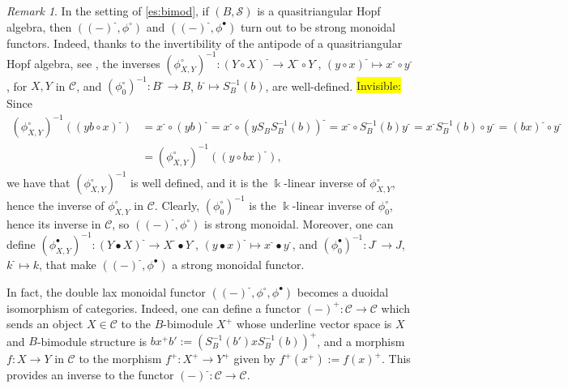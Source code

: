 \documentclass[nosumlimits,twoside]{amsart}
\theoremstyle{definition}
\theoremstyle{remark}
\newtheorem{remark}[remark]{\sc Remark}
\def\revsn{\text{-}}
\def\revsnp{\scriptscriptstyle{+}}
\newenvironment{invisible}{{\noindent\sc \colorbox{yellow}{Invisible:}\;}\color{gray}}{\medskip}
\newcommand{\as}[1]{{\color{blue}{#1}}}
\newcommand{\Cc}{\mathcal{C}}
\newcommand{\Ss}{\mathcal{S}}
\begin{document}
\begin{remark}\label{rmk:duoidaleqbim}%
    In the setting of \cref{es:bimod}, if $(B,\Ss)$ is a quasitriangular Hopf algebra, then $\left( \left( -\right) ^{\revsn },\phi^\circ \right)$ and $\left( \left( -\right) ^{\revsn },\phi^\bullet \right)$ turn out to be strong monoidal functors. Indeed, thanks to the invertibility of the antipode of a quasitriangular Hopf algebra, see \cite[Proposition 1]{Radford}, the inverses $(\phi^{\circ}_{X,Y})^{-1}:(Y\circ X)^{\revsn }\to X^{\revsn }\circ Y^{\revsn }$, $(y\circ x)^{\revsn }\mapsto x^{\revsn }\circ y^{\revsn }$, for $X,Y$ in $\Cc$, and $(\phi^{\circ}_{0})^{-1}:B^{\revsn}\to B$, $b^{\revsn}\mapsto S^{-1}_{B}(b)$, are well-defined. 
    \begin{invisible}
   Since
\[
\begin{split}
(\phi^{\circ}_{X,Y})^{-1}((yb\circ x)^{\revsn})&=x^{\revsn}\circ(yb)^{\revsn}=x^{\revsn}\circ(yS_{B}S^{-1}_{B}(b))^{\revsn}=x^{\revsn}\circ S^{-1}_{B}(b)y^{\revsn}=x^{\revsn}S^{-1}_{B}(b)\circ y^{\revsn}=(bx)^{\revsn}\circ y^{\revsn}\\&=(\phi^{\circ}_{X,Y})^{-1}((y\circ bx)^{\revsn}),
\end{split}
\]
we have that $(\phi^{\circ}_{X,Y})^{-1}$ is well defined, and it is the $\Bbbk$-linear inverse of $\phi^{\circ}_{X,Y}$, hence the inverse of $\phi^{\circ}_{X,Y}$ in $\Cc$. Clearly, $(\phi^{\circ}_{0})^{-1}$ is the $\Bbbk$-linear inverse of $\phi^{\circ}_{0}$, hence its inverse in $\Cc$, so $((-)^{\revsn},\phi^{\circ})$ is strong monoidal.\textbf{}    
    \end{invisible} 
    Moreover, one can define $(\phi^{\bullet}_{X,Y})^{-1}:(Y\bullet X)^{\revsn }\to X^{\revsn }\bullet Y^{\revsn }$, $(y\bullet x)^{\revsn }\mapsto x^{\revsn }\bullet y^{\revsn }$, and $(\phi^{\bullet}_{0})^{-1}:J^{\revsn}\to J$, $k^{\revsn}\mapsto k$, that make $((-)^{\revsn},\phi^{\bullet})$ a strong monoidal functor. 
    
    In fact, the double lax monoidal functor $\left( \left( -\right) ^{\revsn },\phi^\circ,\phi^{\bullet} \right)$ becomes a duoidal isomorphism of categories. Indeed, one can define a functor $(-)^{\revsnp}:\Cc\to\Cc$ which sends an object $X\in\Cc$ to the $B$-bimodule $X^{\revsnp}$ whose underline vector space is $X$ and $B$-bimodule structure is $bx^{\revsnp}b':=(S^{-1}_{B}(b')xS^{-1}_{B}(b))^{\revsnp}$, and a morphism $f:X\rightarrow Y$ in $\Cc$ to the morphism $f^{\revsnp
}:X^{\revsnp}\rightarrow Y^{\revsnp}$ given by $f^{\revsnp}\left( x^{\revsnp}\right) :=f\left( x\right) ^{\revsnp}$. This provides an inverse to the functor $(-)^{\revsn}:\Cc\to\Cc$.
\end{remark}
\end{document}
